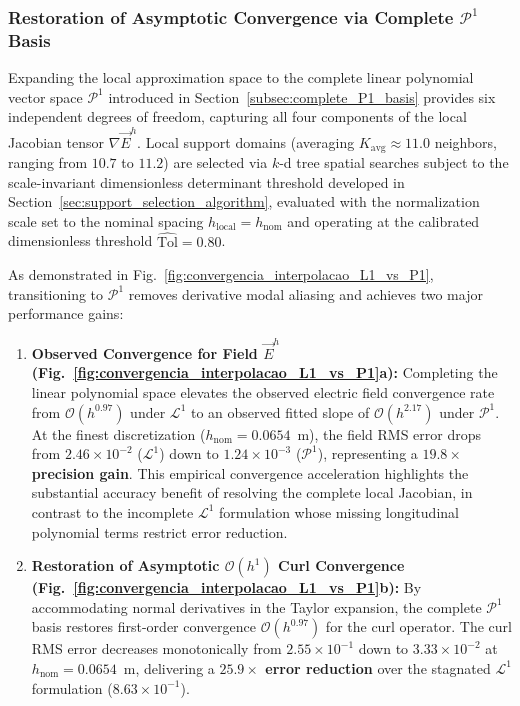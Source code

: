 \documentclass[preprint,12pt]{elsarticle}
\begin{document}
\subsubsection{Restoration of Asymptotic Convergence via Complete \texorpdfstring{$\mathcal{P}^1$}{P1} Basis}
Expanding the local approximation space to the complete linear polynomial vector space $\mathcal{P}^1$ introduced in Section~\ref{subsec:complete_P1_basis} provides six independent degrees of freedom, capturing all four components of the local Jacobian tensor $\nabla\vec{E}^h$. Local support domains (averaging $K_{\mathrm{avg}} \approx 11.0$ neighbors, ranging from $10.7$ to $11.2$) are selected via $k$-d tree spatial searches subject to the scale-invariant dimensionless determinant threshold developed in Section~\ref{sec:support_selection_algorithm}, evaluated with the normalization scale set to the nominal spacing $h_{\mathrm{local}} = h_{\mathrm{nom}}$ and operating at the calibrated dimensionless threshold $\widehat{\mathrm{Tol}} = 0.80$.

As demonstrated in Fig.~\ref{fig:convergencia_interpolacao_L1_vs_P1}, transitioning to $\mathcal{P}^1$ removes derivative modal aliasing and achieves two major performance gains:
\begin{enumerate}
    \item \textbf{Observed Convergence for Field $\vec{E}^h$ (Fig.~\ref{fig:convergencia_interpolacao_L1_vs_P1}a):} Completing the linear polynomial space elevates the observed electric field convergence rate from $\mathcal{O}(h^{0.97})$ under $\mathcal{L}^1$ to an observed fitted slope of $\mathcal{O}(h^{2.17})$ under $\mathcal{P}^1$. At the finest discretization ($h_{\mathrm{nom}} = 0.0654$~m), the field RMS error drops from $2.46 \times 10^{-2}$ ($\mathcal{L}^1$) down to $1.24 \times 10^{-3}$ ($\mathcal{P}^1$), representing a \textbf{$19.8\times$ precision gain}. This empirical convergence acceleration highlights the substantial accuracy benefit of resolving the complete local Jacobian, in contrast to the incomplete $\mathcal{L}^1$ formulation whose missing longitudinal polynomial terms restrict error reduction.
    \item \textbf{Restoration of Asymptotic $\mathcal{O}(h^1)$ Curl Convergence (Fig.~\ref{fig:convergencia_interpolacao_L1_vs_P1}b):} By accommodating normal derivatives in the Taylor expansion, the complete $\mathcal{P}^1$ basis restores first-order convergence $\mathcal{O}(h^{0.97})$ for the curl operator. The curl RMS error decreases monotonically from $2.55 \times 10^{-1}$ down to $3.33 \times 10^{-2}$ at $h_{\mathrm{nom}} = 0.0654$~m, delivering a \textbf{$25.9\times$ error reduction} over the stagnated $\mathcal{L}^1$ formulation ($8.63 \times 10^{-1}$).
\end{enumerate}
\end{document}
